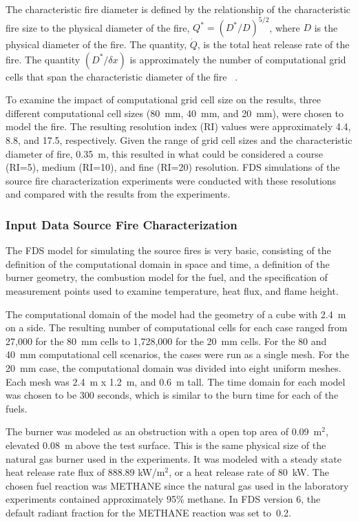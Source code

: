 \documentclass[twoside]{uocthesis}
\begin{document}
{The characteristic fire diameter is defined by the relationship of the characteristic fire size to the physical diameter of the fire, ${Q^*} = ({D^*}/{D})^{5/2}$, where $D$ is the physical diameter of the fire. The quantity, $\dot Q$, is the total heat release rate of the fire. The quantity $({D^*}/{\delta x})$ is approximately the number of computational grid cells that span the characteristic diameter of the fire ~\cite{FDS_Users_Guide,FDS_Validation_Guide}.  

To examine the impact of computational grid cell size on the results, three different computational cell sizes (80~mm, 40~mm, and 20~mm), were chosen to model the fire. The resulting resolution index (RI) values were approximately 4.4, 8.8, and 17.5, respectively. Given the range of grid cell sizes and the characteristic diameter of fire, 0.35~m, this resulted in what could be considered a course (RI=5), medium (RI=10), and fine (RI=20) resolution.  FDS simulations of the source fire characterization experiments were conducted with these resolutions and compared with the results from the experiments.

\subsubsection{Input Data Source Fire Characterization}

The FDS model for simulating the source fires is very basic, consisting of the definition of the computational domain in space and time, a definition of the burner geometry, the combustion model for the fuel, and the specification of measurement points used to examine temperature, heat flux, and flame height.

The computational domain of the model had the geometry of a cube with 2.4~m on a side.  The resulting number of computational cells for each case ranged from 27,000 for the 80~mm cells to 1,728,000 for the 20~mm cells. For the 80 and 40~mm computational cell scenarios, the cases were run as a single mesh.  For the 20~mm case, the computational domain was divided into eight uniform meshes.  Each mesh was 2.4~m x 1.2~m, and 0.6~m tall.  The time domain for each model was chosen to be 300 seconds, which is similar to the burn time for each of the fuels.    

The burner was modeled as an obstruction with a open top area of 0.09~m$^2$, elevated 0.08~m above the test surface.  This is the same physical size of the natural gas burner used in the experiments.  It was modeled with a steady state heat release rate flux of 888.89 kW/m$^2$, or a heat release rate of 80~kW.   The chosen fuel reaction was METHANE since the natural gas used in the laboratory experiments contained approximately 95\% methane.  In FDS version 6, the default radiant fraction for the METHANE reaction was set to~0.2.  

}
\end{document}
